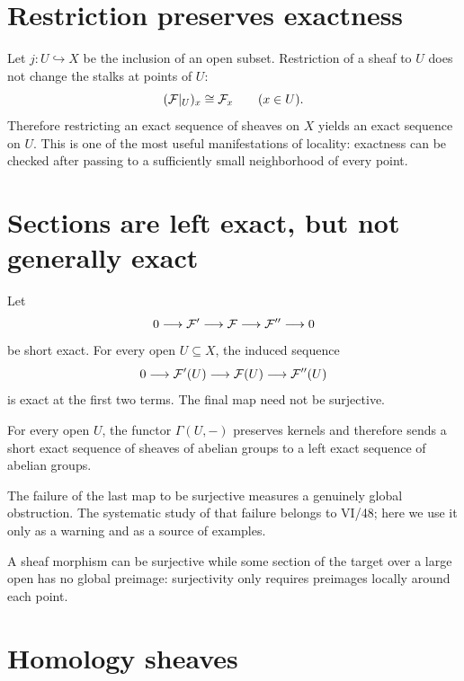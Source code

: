 \section{Restriction preserves exactness}

Let $j:U\hookrightarrow X$ be the inclusion of an open subset.  Restriction of a sheaf to
$U$ does not change the stalks at points of $U$:
\[
(\mathcal F|_U)_x\cong\mathcal F_x\qquad(x\in U).
\]
Therefore restricting an exact sequence of sheaves on $X$ yields an exact sequence on $U$.
This is one of the most useful manifestations of locality: exactness can be checked after
passing to a sufficiently small neighborhood of every point.



\section{Sections are left exact, but not generally exact}

Let
\[
0\longrightarrow\mathcal F'\longrightarrow\mathcal F\longrightarrow\mathcal F''\longrightarrow0
\]
be short exact.  For every open $U\subseteq X$, the induced sequence
\[
0\longrightarrow\mathcal F'(U)\longrightarrow\mathcal F(U)\longrightarrow\mathcal F''(U)
\]
is exact at the first two terms.  The final map need not be surjective.

\begin{theorem}\label{thm:vi16-left-exact-sections}
For every open $U$, the functor $\Gamma(U,-)$ preserves kernels and therefore sends a short
exact sequence of sheaves of abelian groups to a left exact sequence of abelian groups.
\end{theorem}

The failure of the last map to be surjective measures a genuinely global obstruction.  The
systematic study of that failure belongs to VI/48; here we use it only as a warning and as a
source of examples.



\begin{example}\label{ex:vi16-expand-03}
A sheaf morphism can be surjective while some section of the target over a large open has no global preimage: surjectivity only requires preimages locally around each point.
\end{example}
\section{Homology sheaves}

